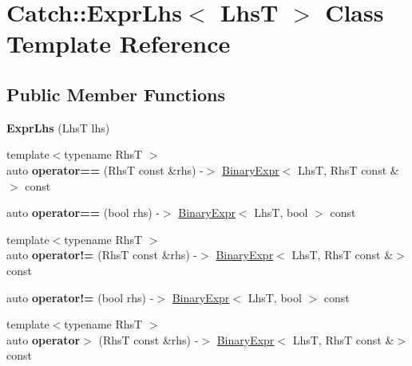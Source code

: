 \hypertarget{classCatch_1_1ExprLhs}{}\section{Catch\+:\+:Expr\+Lhs$<$ LhsT $>$ Class Template Reference}
\label{classCatch_1_1ExprLhs}
\subsection*{Public Member Functions}
\begin{DoxyCompactItemize}
\item 
\mbox{\label{classCatch_1_1ExprLhs_ad22c6af1a7d6993240624d299714a479}} 
{\bfseries Expr\+Lhs} (LhsT lhs)
\item 
\mbox{\label{classCatch_1_1ExprLhs_a3068adff1dbbaeec62ffc368d4d6cc4d}} 
{\footnotesize template$<$typename RhsT $>$ }\\auto {\bfseries operator==} (RhsT const \&rhs) -\/$>$ \hyperlink{classCatch_1_1BinaryExpr}{Binary\+Expr}$<$ LhsT, RhsT const \&$>$ const
\item 
\mbox{\label{classCatch_1_1ExprLhs_ab707a84abdffbdc35962a495e238d393}} 
auto {\bfseries operator==} (bool rhs) -\/$>$ \hyperlink{classCatch_1_1BinaryExpr}{Binary\+Expr}$<$ LhsT, bool $>$ const
\item 
\mbox{\label{classCatch_1_1ExprLhs_a5e10eab8aed53dd000b89d8fd7754437}} 
{\footnotesize template$<$typename RhsT $>$ }\\auto {\bfseries operator!=} (RhsT const \&rhs) -\/$>$ \hyperlink{classCatch_1_1BinaryExpr}{Binary\+Expr}$<$ LhsT, RhsT const \&$>$ const
\item 
\mbox{\label{classCatch_1_1ExprLhs_a60eca847201d057d8a8b7222c69b619c}} 
auto {\bfseries operator!=} (bool rhs) -\/$>$ \hyperlink{classCatch_1_1BinaryExpr}{Binary\+Expr}$<$ LhsT, bool $>$ const
\item 
\mbox{\label{classCatch_1_1ExprLhs_a23cb0cd983a1ac9c3df5160542199b83}} 
{\footnotesize template$<$typename RhsT $>$ }\\auto {\bfseries operator$>$} (RhsT const \&rhs) -\/$>$ \hyperlink{classCatch_1_1BinaryExpr}{Binary\+Expr}$<$ LhsT, RhsT const \&$>$ const

\end{DoxyCompactItemize}
